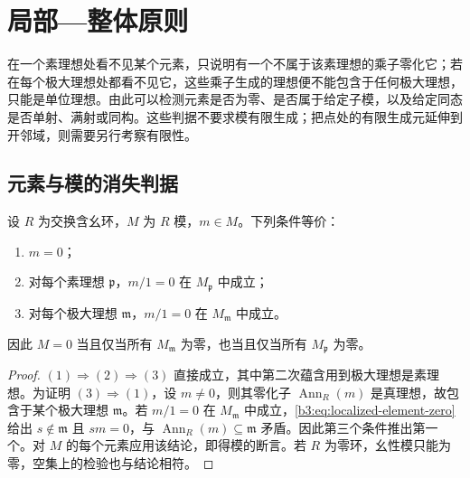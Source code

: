 
\section{局部—整体原则}
\label{b3:sec:0204}

在一个素理想处看不见某个元素，只说明有一个不属于该素理想的乘子零化它；若在每个极大理想处都看不见它，这些乘子生成的理想便不能包含于任何极大理想，只能是单位理想。由此可以检测元素是否为零、是否属于给定子模，以及给定同态是否单射、满射或同构。这些判据不要求模有限生成；把点处的有限生成元延伸到开邻域，则需要另行考察有限性。

\subsection{元素与模的消失判据}
\label{b3:subsec:0204:01}

\begin{theorem}\label{b3:thm:local-zero-detection}
	设 \(R\) 为交换含幺环，\(M\) 为 \(R\) 模，\(m\in M\)。下列条件等价：
	\begin{enumerate}
		\item \(m=0\)；
		\item 对每个素理想 \(\mathfrak p\)，\(m/1=0\) 在 \(M_{\mathfrak p}\) 中成立；
		\item 对每个极大理想 \(\mathfrak m\)，\(m/1=0\) 在 \(M_{\mathfrak m}\) 中成立。
	\end{enumerate}
	因此 \(M=0\) 当且仅当所有 \(M_{\mathfrak m}\) 为零，也当且仅当所有 \(M_{\mathfrak p}\) 为零。
\end{theorem}
\begin{proof}
	\((1)\Rightarrow(2)\Rightarrow(3)\) 直接成立，其中第二次蕴含用到极大理想是素理想。为证明 \((3)\Rightarrow(1)\)，设 \(m\ne0\)，则其零化子 \(\operatorname{Ann}_R(m)\) 是真理想，故包含于某个极大理想 \(\mathfrak m\)。若 \(m/1=0\) 在 \(M_{\mathfrak m}\) 中成立，\eqref{b3:eq:localized-element-zero}给出 \(s\notin\mathfrak m\) 且 \(sm=0\)，与 \(\operatorname{Ann}_R(m)\subseteq\mathfrak m\) 矛盾。因此第三个条件推出第一个。对 \(M\) 的每个元素应用该结论，即得模的断言。若 \(R\) 为零环，幺性模只能为零，空集上的检验也与结论相符。
\end{proof}

